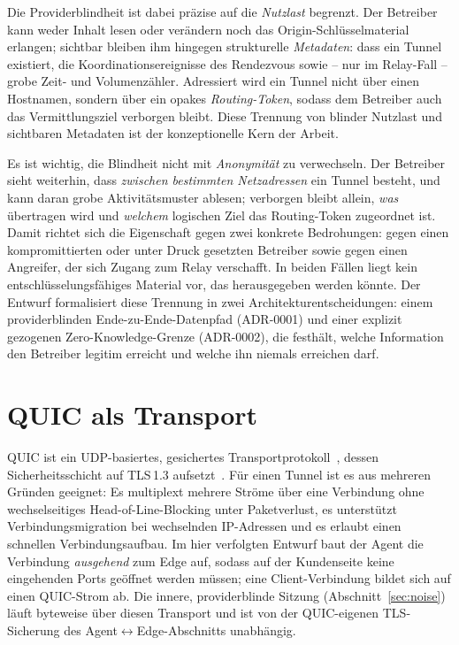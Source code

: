 Die Providerblindheit ist dabei präzise auf die \emph{Nutzlast}
begrenzt. Der Betreiber kann weder Inhalt lesen oder verändern noch das
Origin-Schlüsselmaterial erlangen; sichtbar bleiben ihm hingegen strukturelle
\emph{Metadaten}: dass ein Tunnel existiert, die Koordinationsereignisse des
Rendezvous sowie -- nur im Relay-Fall -- grobe Zeit- und Volumenzähler. Adressiert
wird ein Tunnel nicht über einen Hostnamen, sondern über ein opakes
\emph{Routing-Token}, sodass dem Betreiber auch das Vermittlungsziel verborgen
bleibt. Diese Trennung von blinder Nutzlast und sichtbaren Metadaten ist der
konzeptionelle Kern der Arbeit.

Es ist wichtig, die Blindheit nicht mit \emph{Anonymität} zu verwechseln. Der
Betreiber sieht weiterhin, dass \emph{zwischen bestimmten Netzadressen} ein Tunnel
besteht, und kann daran grobe Aktivitätsmuster ablesen; verborgen bleibt allein,
\emph{was} übertragen wird und \emph{welchem} logischen Ziel das Routing-Token
zugeordnet ist. Damit richtet sich die Eigenschaft gegen zwei konkrete
Bedrohungen: gegen einen kompromittierten oder unter Druck gesetzten Betreiber
sowie gegen einen Angreifer, der sich Zugang zum Relay verschafft. In beiden
Fällen liegt kein entschlüsselungsfähiges Material vor, das herausgegeben werden
könnte. Der Entwurf formalisiert diese Trennung in zwei Architekturentscheidungen:
einem providerblinden Ende-zu-Ende-Datenpfad (ADR-0001) und einer explizit
gezogenen Zero-Knowledge-Grenze (ADR-0002), die festhält, welche Information den
Betreiber legitim erreicht und welche ihn niemals erreichen darf.

\section{QUIC als Transport}
\label{sec:quic}

QUIC ist ein UDP-basiertes, gesichertes Transportprotokoll~\cite{rfc9000}, dessen
Sicherheitsschicht auf TLS\,1.3 aufsetzt~\cite{rfc9001}. Für einen Tunnel ist es
aus mehreren Gründen geeignet: Es multiplext mehrere Ströme über eine Verbindung
ohne wechselseitiges Head-of-Line-Blocking unter Paketverlust, es unterstützt
Verbindungsmigration bei wechselnden IP-Adressen und es erlaubt einen schnellen
Verbindungsaufbau. Im hier verfolgten Entwurf baut der Agent die Verbindung
\emph{ausgehend} zum Edge auf, sodass auf der Kundenseite keine eingehenden Ports
geöffnet werden müssen; eine Client-Verbindung bildet sich auf einen QUIC-Strom
ab. Die innere, providerblinde Sitzung (Abschnitt~\ref{sec:noise}) läuft byteweise
über diesen Transport und ist von der QUIC-eigenen TLS-Sicherung des
Agent$\leftrightarrow$Edge-Abschnitts unabhängig.

